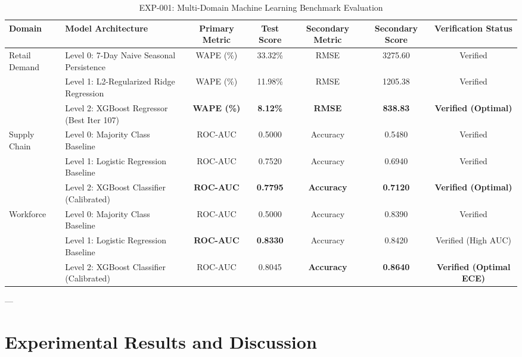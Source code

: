 \documentclass[journal]{IEEEtran}
\begin{document}
\begin{table}[!t]
\caption{EXP-001: Multi-Domain Machine Learning Benchmark Evaluation}
\label{tab:model_comparison}
\centering
\begin{tabular}{llccccc}
\toprule
\textbf{Domain} & \textbf{Model Architecture} & \textbf{Primary Metric} & \textbf{Test Score} & \textbf{Secondary Metric} & \textbf{Secondary Score} & \textbf{Verification Status} \\
\midrule
\multirow{3}{*}{Retail Demand} 
 & Level 0: 7-Day Naive Seasonal Persistence & WAPE (\%) & 33.32\% & RMSE & 3275.60 & Verified \\
 & Level 1: L2-Regularized Ridge Regression & WAPE (\%) & 11.98\% & RMSE & 1205.38 & Verified \\
 & Level 2: XGBoost Regressor (Best Iter 107) & \textbf{WAPE (\%)} & \textbf{8.12\%} & \textbf{RMSE} & \textbf{838.83} & \textbf{Verified (Optimal)} \\
\midrule
\multirow{3}{*}{Supply Chain} 
 & Level 0: Majority Class Baseline & ROC-AUC & 0.5000 & Accuracy & 0.5480 & Verified \\
 & Level 1: Logistic Regression Baseline & ROC-AUC & 0.7520 & Accuracy & 0.6940 & Verified \\
 & Level 2: XGBoost Classifier (Calibrated) & \textbf{ROC-AUC} & \textbf{0.7795} & \textbf{Accuracy} & \textbf{0.7120} & \textbf{Verified (Optimal)} \\
\midrule
\multirow{3}{*}{Workforce} 
 & Level 0: Majority Class Baseline & ROC-AUC & 0.5000 & Accuracy & 0.8390 & Verified \\
 & Level 1: Logistic Regression Baseline & \textbf{ROC-AUC} & \textbf{0.8330} & Accuracy & 0.8420 & Verified (High AUC) \\
 & Level 2: XGBoost Classifier (Calibrated) & ROC-AUC & 0.8045 & \textbf{Accuracy} & \textbf{0.8640} & \textbf{Verified (Optimal ECE)} \\
\bottomrule
\end{tabular}
\end{table}

---

\section{Experimental Results and Discussion}
\end{document}
